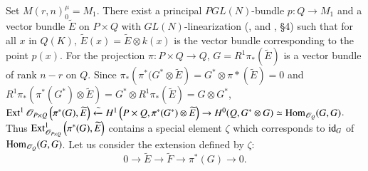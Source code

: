 \begin{Proof}
Set $M(r,n)^{\mu}_0=M_1$. There exist a principal $PGL(N)$-bundle
$p:Q\rightarrow M_1$ and a vector bundle $\widetilde{E}$ on $P\times
Q$ with $GL(N)$-linearization (\cite[Proposition 6.4]{key10}, 
and \cite{key9}, \S 4) such that for all $x$ in $Q(K)$,
$\widetilde{E}(x)=\widetilde{E}\otimes k(x)$ is the vector bundle
corresponding to the point $p(x)$. For the projection $\pi:P\times
Q\rightarrow Q$, $G=R^{1}\pi_{\ast}(\widetilde{E})$ is a vector bundle
of rank $n-r$ on $Q$. Since
$\pi_{\ast}\left(\pi^{\ast}(G^{\ast}\otimes
\widetilde{E}\right)=G^{\ast}\otimes \pi \ast
\left(\widetilde{E}\right)=0$ and
$R^{1}\pi_{\ast}\left(\pi^{\ast}(G^{\ast})\otimes
\widetilde{E}\right)=G^{\ast}\otimes
R^{1}\pi_{\ast}\left(\widetilde{E}\right)=G\otimes G^{\ast}$,
$\operatorname{Ext}^{1}\mathscr{O}_{P\times
  Q}\left(\pi^{\ast}(G),\widetilde{E}\right)\xleftarrow{\sim}H^{1}\left(P\times
Q,\pi^{\ast}(G^{\ast})\otimes
\widetilde{E}\right)\to H^{0}(Q,G^{\ast}\otimes G)\simeq
\operatorname{Hom}_{\mathscr{O}_{Q}}(G,G)$. Thus $\operatorname{Ext}^{1}_{\mathscr{O}_{P\times
    Q}}\left(\pi^{\ast}(G),\widetilde{E}\right)$ contains a special
element $\zeta$ which corresponds to $\operatorname{id}_{G}$ of
$\operatorname{Hom}_{\mathscr{O}_Q}(G,G)$. Let us consider the extension defined by
$\zeta$:
$$
0\to \widetilde{E}\to \widetilde{F}\to \pi^{\ast}(G)\to 0.
$$\pageoriginale


\end{Proof}
